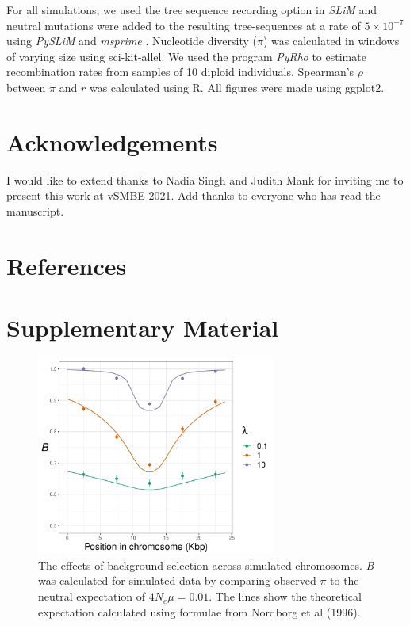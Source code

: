 \documentclass[11pt,twoside, onecolumn]{GSA_format}
\newcommand{\beginsupplement}{%
        \setcounter{table}{0}
        \renewcommand{\thetable}{S\arabic{table}}%
        \setcounter{figure}{0}
        \renewcommand{\thefigure}{S\arabic{figure}}%
     }
\begin{document}
For all simulations, we used the tree sequence recording option in \textit{SLiM} and neutral mutations were added to the resulting tree-sequences at a rate of $5\times10^{-7}$ using \textit{PySLiM} and \textit{msprime} \citep{Haller2019-za, Kelleher2016-zz}. Nucleotide diversity ($\pi$) was calculated in windows of varying size using sci-kit-allel. We used the program \textit{PyRho} \citep{Spence2019} to estimate recombination rates from samples of 10 diploid individuals. Spearman's $\rho$ between $\pi$ and $r$ was calculated using R. All figures were made using ggplot2.


\section{Acknowledgements}

I would like to extend thanks to Nadia Singh and Judith Mank for inviting me to present this work at vSMBE 2021. Add thanks to everyone who has read the manuscript. 


\section{References}


\beginsupplement

\onecolumn 

\section{Supplementary Material}

\begin{figure}[h]
\includegraphics[width=0.7\textwidth]{../TheoreticalExpectation/B_fixed_plot}\centering
\caption{The effects of background selection across simulated chromosomes. \textit{B} was calculated for simulated data by comparing observed $\pi$ to the neutral expectation of $4N_e\mu=0.01$. The lines show the theoretical expectation calculated using formulae from Nordborg et al (1996).}
\label{fig:BGS_element_plot}
\end{figure}
\end{document}

